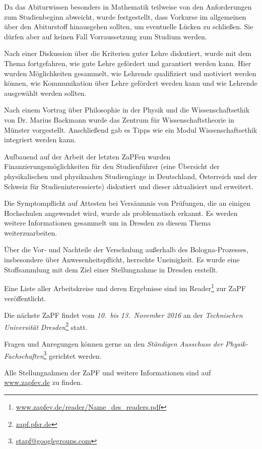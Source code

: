Da das Abiturwissen besonders in Mathematik teilweise von den Anforderungen 
zum Studienbeginn abweicht, wurde festgestellt, dass Vorkurse im allgemeinen 
über den Abiturstoff hinausgehen sollten, um eventuelle Lücken zu schließen. 
Sie dürfen aber auf keinen Fall Vorraussetzung zum Studium werden.

Nach einer Diskussion über die Kriterien guter Lehre diskutiert, wurde mit dem 
Thema fortgefahren, wie gute Lehre gefördert und garantiert werden kann. 
Hier wurden Möglichkeiten gesammelt, wie Lehrende qualifiziert und motiviert werden können, 
wie Kommunikation über Lehre gefördert werden kann und wie Lehrende ausgewählt werden sollten.

Nach einem Vortrag über Philosophie in der Physik und die Wissenschaftsethik von Dr. Marius
Backmann wurde das Zentrum für Wissenschaftstheorie in Münster
vorgestellt. Anschließend gab es Tipps wie ein Modul Wissenschaftsethik integriert werden kann.

Aufbauend auf der Arbeit der letzten ZaPFen wurden Finanzierungsmöglichkeiten für den 
Studienführer (eine Übersicht der physikalischen und physiknahen Studiengänge in 
Deutschland, Österreich und der Schweiz für Studieninteressierte) diskutiert und dieser aktualisiert und erweitert.

Die Symptompflicht auf Attesten bei Versäumnis von Prüfungen, die an einigen Hochschulen 
angewendet wird, wurde als problematisch erkannt. Es werden weitere Informationen gesammelt um in Dresden zu diesem Thema weiterzuarbeiten.

Über die Vor- und Nachteile der Verschulung außerhalb des Bologna-Prozesses, 
insbesondere über Anwesenheitspflicht, herrschte Uneinigkeit. 
Es wurde eine Stoffsammlung mit dem Ziel einer Stellungnahme in Dresden erstellt.

Eine Liste aller Arbeitskreise und deren Ergebnisse sind im
Reader\footnote{\href{http://www.zapfev.de/reader/Name_des_readers.pdf}{\url{www.zapfev.de/reader/Name_des_readers.pdf}}}
zur ZaPF veröffentlicht.

\vfill

Die nächste ZaPF findet vom \emph{10.\ bis 13.\ November 2016} an der  \emph{Technischen Universität Dresden}\footnote{\href{https://zapf.pfsr.de/}{\url{zapf.pfsr.de}}} statt.

Fragen und Anregungen können gerne an den \emph{Ständigen Ausschuss der Physik-Fachschaften}\footnote{\href{mailto:stapf@googlegroups.com}{\url{stapf@googlegroups.com}}} gerichtet werden.

Alle Stellungnahmen der ZaPF und weitere Informationen sind auf \href{http://www.zapfev.de}{\url{www.zapfev.de}} zu finden.

